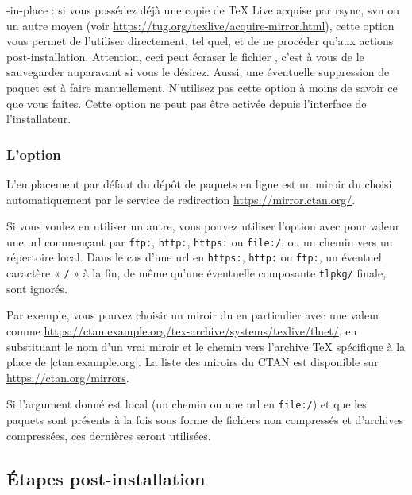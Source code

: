 \documentclass[german, english, french]{article}
\renewcommand{\TL}{\TeX{} Live\xspace}%
\begin{document}
\begin{ttdescription}
\item[-in-place] : si vous possédez déjà une copie de \TL{} acquise par rsync,
  svn ou un autre moyen (voir
  \url{https://tug.org/texlive/acquire-mirror.html}), cette option vous permet
  de l'utiliser directement, tel quel, et de ne procéder qu'aux actions
  post-installation. Attention, ceci peut écraser le fichier
  , c'est à vous de le sauvegarder auparavant si
  vous le désirez. Aussi, une éventuelle suppression de paquet est à faire
  manuellement. N'utilisez pas cette option à moins de savoir ce que vous
  faites. Cette option ne peut pas être activée depuis l'interface de
  l'installateur.
\end{ttdescription}

\subsubsection{L'option }
\label{sec:location}

L'emplacement par défaut du dépôt de paquets en ligne est un miroir du \CTAN{}
choisi automatiquement par le service de redirection
\url{https://mirror.ctan.org/}.

Si vous voulez en utiliser un autre, vous pouvez utiliser l'option
 avec pour valeur une url commençant par \texttt{ftp:},
\texttt{http:}, \texttt{https:} ou \texttt{file:/}, ou un chemin vers un
répertoire local.  Dans le cas d'une url en \texttt{https:}, \texttt{http:} ou
\texttt{ftp:}, un éventuel caractère « \texttt{/} » à la fin, de même qu'une
éventuelle composante \texttt{tlpkg/} finale, sont ignorés.

Par exemple, vous pouvez choisir un miroir du \CTAN{} en particulier avec une
valeur comme \url{https://ctan.example.org/tex-archive/systems/texlive/tlnet/},
en substituant le nom d'un vrai miroir et le chemin vers l'archive \TeX{}
spécifique à la place de |ctan.example.org|. La liste des miroirs du CTAN est
disponible sur \url{https://ctan.org/mirrors}.

Si l'argument donné est local (un chemin ou une url en \texttt{file:/}) et que
les paquets sont présents à la fois sous forme de fichiers non compressés et
d'archives compressées, ces dernières seront utilisées.

\subsection{Étapes post-installation}
\label{sec:postinstall}
\end{document}
